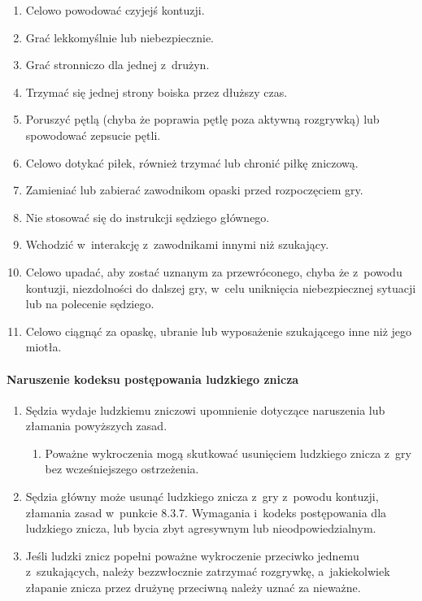 \documentclass[12pt,a4paper]{article}
\begin{document}
\begin{enumerate}
	\item Celowo powodować czyjejś kontuzji.

	\item Grać lekkomyślnie lub niebezpiecznie.

	\item Grać stronniczo dla jednej z~drużyn.

	\item Trzymać się jednej strony boiska przez dłuższy czas.
	
	\item Poruszyć pętlą (chyba że poprawia pętlę poza aktywną rozgrywką) lub spowodować zepsucie pętli.

	\item Celowo dotykać piłek, również trzymać lub chronić piłkę zniczową.

	\item Zamieniać lub zabierać zawodnikom opaski przed rozpoczęciem gry.

	\item Nie stosować się do instrukcji sędziego głównego.

	\item Wchodzić w~interakcję z~zawodnikami innymi niż szukający.

	\item Celowo upadać, aby zostać uznanym za przewróconego, chyba że z~powodu
	      kontuzji, niezdolności do dalszej gry, w~celu uniknięcia niebezpiecznej
	      sytuacji lub na polecenie sędziego.

	\item Celowo ciągnąć za opaskę, ubranie lub wyposażenie szukającego inne
	      niż jego miotła.
\end{enumerate}

\paragraph{Naruszenie kodeksu postępowania ludzkiego znicza}

\begin{enumerate}
	\item Sędzia wydaje ludzkiemu zniczowi upomnienie dotyczące naruszenia lub
	      złamania powyższych zasad.
	      \begin{enumerate}
		      \item Poważne wykroczenia mogą skutkować usunięciem ludzkiego znicza z~gry
		            bez wcześniejszego ostrzeżenia.
	      \end{enumerate}

	\item Sędzia główny może usunąć ludzkiego znicza z~gry z~powodu kontuzji,
	      złamania zasad w~punkcie 8.3.7. Wymagania i~kodeks postępowania dla
	      ludzkiego znicza, lub bycia zbyt agresywnym lub nieodpowiedzialnym.

	\item Jeśli ludzki znicz popełni poważne wykroczenie przeciwko jednemu z~szukających, należy bezzwłocznie zatrzymać rozgrywkę, a~jakiekolwiek
	      złapanie znicza przez drużynę przeciwną należy uznać za nieważne.
\end{enumerate}
\end{document}
